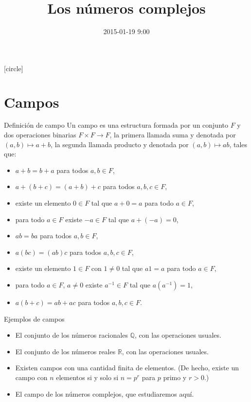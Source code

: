 \documentclass[spanish,presentation]{beamer}
\date{2015-01-19 9:00}
\title{Los números complejos}
\begin{document}
\maketitle
{}
[circle]

\tableofcontents

\section{Campos}
\label{sec-1}

\begin{frame}[label=sec-1-1]{Definición de campo}
Un campo es una estructura formada por un conjunto \(F\) y dos
operaciones binarias \(F\times F\to F\), la primera llamada \alert{suma}
y denotada por \((a,b)\mapsto a+b\), la segunda llamada \alert{producto} y
denotada por \((a,b)\mapsto ab\), tales que:

\begin{itemize}
\item \(a+b=b+a\) para todos \(a,b\in F\),
\item \(a+(b+c)=(a+b)+c\) para todos \(a,b,c\in F\),
\item existe un elemento \(0\in F\) tal que \(a+0=a\) para todo \(a\in F\),
\item para todo \(a\in F\) existe \(-a\in F\) tal que \(a+(-a)=0\),
\item \(ab=ba\) para todos \(a,b\in F\),
\item \(a(bc)=(ab)c\) para todos \(a,b,c\in F\),
\item existe un elemento \(1\in F\) con \(1\ne 0\) tal que \(a1=a\) para todo \(a\in F\),
\item para todo \(a\in F\), \(a\ne 0\) existe \(a^{-1}\in F\) tal que \(a(a^{-1})=1\),
\item \(a(b+c)=ab+ac\) para todos \(a,b,c\in F\).
\end{itemize}
\end{frame}

\begin{frame}[label=sec-1-2]{Ejemplos de campos}
\begin{itemize}
\item El conjunto de los números racionales \(\mathbb{Q}\), con las
operaciones usuales.
\item El conjunto de los números reales \(\mathbb{R}\), con las
operaciones usuales.
\item Existen campos con una cantidad finita de elementos. (De hecho,
existe un campo con \(n\) elementos si y solo si \(n=p^{r}\) para
\(p\) primo y \(r>0\).)
\item El campo de los números complejos, que estudiaremos aquí.
\end{itemize}
\end{frame}
\end{document}
